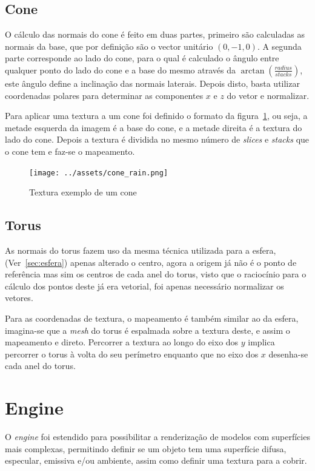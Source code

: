 \documentclass[a4paper]{article}
\begin{document}
\subsection{Cone}
O cálculo das normais do cone é feito em duas partes, primeiro são calculadas
as normais da base, que por definição são o vector unitário $(0,-1,0)$. A
segunda parte corresponde ao lado do cone, para o qual é calculado o ângulo
entre qualquer ponto do lado do cone e a base do mesmo através da
$\arctan(\frac{radius}{stacks})$, este ângulo define a
inclinação das normais laterais. Depois disto, basta utilizar coordenadas
polares para determinar as componentes $x$ e $z$ do vetor e normalizar.

Para aplicar uma textura a um cone foi definido o formato da
figura~\ref{fig:conetexture}, ou seja, a metade esquerda da imagem é a base do
cone, e a metade direita é a textura do lado do cone. Depois a textura é
dividida no mesmo número de \textit{slices} e \textit{stacks} que o cone tem e
faz-se o mapeamento.

\begin{figure}[H]
    \centering
    \texttt{[image: ../assets/cone\_rain.png]}
    \caption{Textura exemplo de um cone}\label{fig:conetexture}
\end{figure}

\subsection{Torus}
As normais do torus fazem uso da mesma técnica utilizada para a esfera,
(Ver~\ref{sec:esfera}) apenas alterado o centro, agora a origem já não é o
ponto de referência mas sim os centros de cada anel do torus, visto que o
raciocínio para o cálculo dos pontos deste já era vetorial, foi apenas
necessário normalizar os vetores.

Para as coordenadas de textura, o mapeamento é também similar ao da esfera,
imagina-se que a \textit{mesh} do torus é espalmada sobre a textura deste, e
assim o mapeamento e direto. Percorrer a textura ao longo do eixo dos $y$
implica percorrer o torus à volta do seu perímetro enquanto que no eixo dos $x$
desenha-se cada anel do torus.

\section{Engine}

O \textit{engine} foi estendido para possibilitar a renderização de
modelos com superfícies mais complexas, permitindo definir se um objeto tem uma
superfície difusa, especular, emissiva e/ou ambiente, assim como definir uma
textura para a cobrir.
\end{document}
